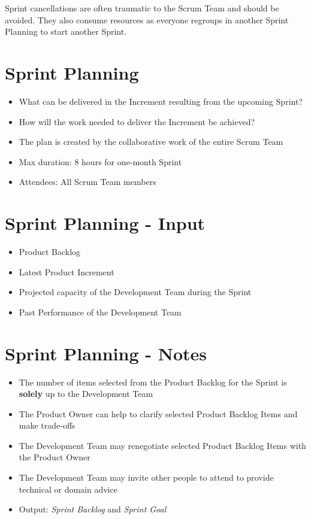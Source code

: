 \documentclass[a4paper,11pt,twocolumn]{article}
\begin{document}
\begin{tcolorbox}[colback=black!8!white,colframe=gray!50!black,title=Note,sharp corners,fonttitle=\normalsize\bfseries,fontupper=\normalsize,left=0.7em,right=0.7em]
	Sprint cancellations are often traumatic to the Scrum Team and should be avoided. They also consume resources as everyone regroups in another Sprint Planning to start another Sprint.
\end{tcolorbox}

\section*{Sprint Planning}
\begin{itemize}
    \item What can be delivered in the Increment resulting from the upcoming Sprint?
	\item How will the work needed to deliver the Increment be achieved?
	\item The plan is created by the collaborative work of the entire Scrum Team
	\item Max duration: 8 hours for one-month Sprint
	\item Attendees: All Scrum Team members
\end{itemize}

\section*{Sprint Planning - Input}
\begin{itemize}
    \item Product Backlog
    \item Latest Product Increment
    \item Projected capacity of the Development Team during the Sprint
    \item Past Performance of the Development Team
\end{itemize}

\section*{Sprint Planning - Notes}
\begin{itemize}
    \item The number of items selected from the Product Backlog for the Sprint is \textbf{solely} up to the Development Team
	\item The Product Owner can help to clarify selected Product Backlog Items and make trade-offs
	\item The Development Team may renegotiate selected Product Backlog Items with the Product Owner
	\item The Development Team may invite other people to attend to provide technical or domain advice
	\item Output: \textit{Sprint Backlog} and \textit{Sprint Goal}
\end{itemize}
\end{document}
